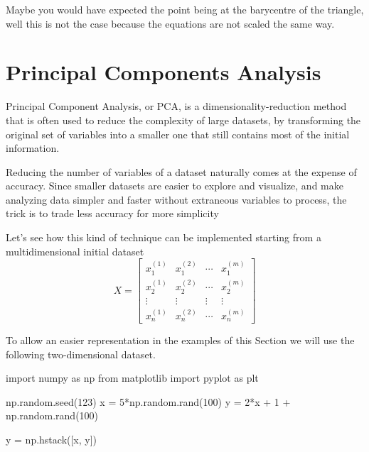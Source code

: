 Maybe you would have expected the point being at the barycentre of the triangle, well this is not the case because the equations are not scaled the same way.



\section{Principal Components Analysis}
\label{sec:pca}

Principal Component Analysis, or PCA, is a dimensionality-reduction method that is often used to reduce the complexity of large datasets, by transforming the original set of variables into a smaller one that still contains most of the initial information.

Reducing the number of variables of a dataset naturally comes at the expense of accuracy. Since smaller datasets are easier to explore and visualize, and make analyzing data simpler and faster without extraneous variables to process, the trick is to trade less accuracy for more simplicity

Let's see how this kind of technique can be implemented starting from 
a multidimensional initial dataset 
\begin{equation}
X=\begin{bmatrix}
x^{(1)}_1 &x^{(2)}_1&\cdots &x^{(m)}_1 \\
x^{(1)}_2 &x^{(2)}_2&\cdots &x^{(m)}_2 \\
\vdots &\vdots &\vdots &\vdots \\
x^{(1)}_n &x^{(2)}_n&\cdots &x^{(m)}_n 
\end{bmatrix}
\end{equation}

To allow an easier representation in the examples of this Section we will use the following two-dimensional dataset.

\begin{ipython}
import numpy as np
from matplotlib import pyplot as plt
	
np.random.seed(123)
x = 5*np.random.rand(100)
y = 2*x + 1 + np.random.rand(100)

y = np.hstack([x, y])
\end{ipython}

